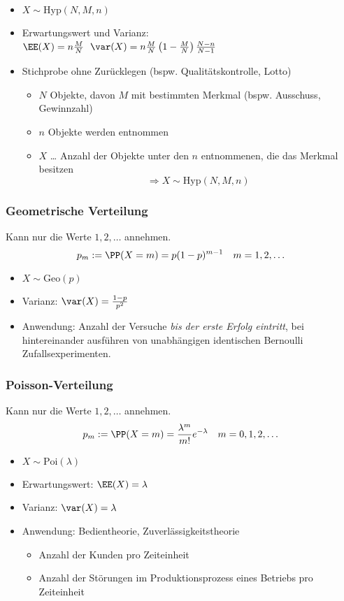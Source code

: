 \begin{itemize}
\item $X\sim \mathrm{Hyp}(N,M,n)$
\item Erwartungswert und Varianz: \\
$\EE(X)=n\frac{M}{N}$\
$\var (X)=n\frac{M}{N}\left(1-\frac{M}{N}\right) \frac{N-n}{N-1}$
\item Stichprobe ohne Zurücklegen (bspw. Qualitätskontrolle, Lotto)
\begin{itemize}
\item $N$ Objekte, davon $M$ mit bestimmten Merkmal (bspw. Ausschuss, Gewinnzahl)
\item $n$ Objekte werden entnommen
\item $X$ … Anzahl der Objekte unter den $n$ entnommenen, die das Merkmal besitzen
$$\Rightarrow X\sim \mathrm{Hyp}(N,M,n)$$
\end{itemize}
\end{itemize}

\subsubsection{Geometrische Verteilung}
Kann nur die Werte $1,2,\dots$ annehmen.
$$p_m:=\PP(X=m)=p(1-p)^{m-1} \quad m=1,2,\dots$$
\begin{itemize}
\item $X\sim \mathrm{Geo}(p)$
\item Varianz: $\var(X)=\frac{1-p}{p^2}$
\item Anwendung: Anzahl der Versuche \emph{bis der erste Erfolg eintritt}, bei hintereinander ausführen von unabhängigen identischen Bernoulli Zufallsexperimenten.
\end{itemize}

\subsubsection{Poisson-Verteilung}
Kann nur die Werte $1,2,\dots$ annehmen.
$$p_m:=\PP(X=m)=\frac{\lambda^m}{m!}e^{-\lambda} \quad m=0,1,2,\dots$$
\begin{itemize}
\item $X\sim \mathrm{Poi}(\lambda)$
\item Erwartungswert: $\EE(X)=\lambda$
\item Varianz: $\var(X)=\lambda$
\item Anwendung: Bedientheorie, Zuverlässigkeitstheorie
\begin{itemize}
\item Anzahl der Kunden pro Zeiteinheit
\item Anzahl der Störungen im Produktionsprozess eines Betriebs pro Zeiteinheit
\end{itemize}
\end{itemize}

